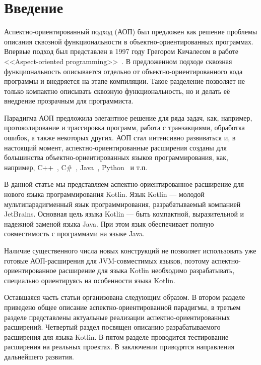 \documentclass[conference]{IEEEtran}
\begin{document}
\section{Введение}

Аспектно-ориентированный подход (АОП) был предложен как решение проблемы
описания сквозной функциональности в объектно-ориентированных программах.
Впервые подход был представлен в 1997 году Грегором Кичалесом в работе
<<Aspect-oriented programming>>~\cite{kiczales_aop}.
В предложенном подходе сквозная функциональность описывается отдельно от
объектно-ориентированного кода программы и внедряется на этапе компиляции.
Такое разделение позволяет не только компактно описывать сквозную 
функциональность, но и делать её внедрение прозрачным для программиста.

Парадигма АОП предложила элегантное решение для ряда задач, как, например, 
протоколирование и трассировка программ, работа с транзакциями, обработка
ошибок, а также некоторых других.
АОП стал интенсивно развиваться и, в настоящий момент, аспектно-ориентированные
расширения созданы для большинства объектно-ориентированных языков
программирования, как, например, C++~\cite{aspectC_homepage},
C\#~\cite{postsharp_doc}, Java~\cite{aspectj_doc,springAOP_doc},
Python~\cite{spring_python} и т.п.

В данной статье мы представляем аспектно-ориентированное расширение для нового 
языка программирования Kotlin.
Язык Kotlin --- молодой мультипарадигменный язык программирования,
разрабатываемый компанией JetBrains.
Основная цель языка Kotlin --- быть компактной, выразительной и надежной заменой
языка Java.
При этом язык обеспечивает полную совместимость с программами на языке
Java.

Наличие существенного числа новых конструкций не позволяет использовать уже 
готовые АОП-расширения для JVM-совместимых языков, поэтому
аспектно-ориентированное  расширение для языка Kotlin необходимо разрабатывать,
специально ориентируясь на особенности языка Kotlin. 

Оставшаяся часть статьи организована следующим образом. 
В втором разделе приведено общее описание аспектно-ориентированной парадигмы, 
в третьем разделе представлены актуальные реализации аспектно-ориентированных 
расширений.
Четвертый раздел посвящен описанию разрабатываемого расширения для языка Kotlin.
В пятом разделе проводится тестирование расширения на реальных проектах.
В заключении приводятся направления дальнейшего развития. 
\end{document}
